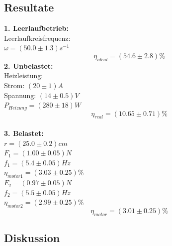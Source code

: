 \documentclass[12pt,a4paper]{article}
\begin{document}
\begin{multicols}{2}

\subsection{Resultate}
\textbf{1. Leerlaufbetrieb:}\\
Leerlaufkreisfrequenz:\\
$\omega=(50.0 \pm 1.3)s^{-1}$
$$\eta_{ideal}=(54.6 \pm 2.8)\%$$
\textbf{2. Unbelastet:}\\
Heizleistung:\\
Strom: $(20 \pm 1) A$\\
Spannung: $(14 \pm 0.5) V$\\
$P_{Heizung}=(280 \pm 18)W$\\
$$\eta_{real}=(10.65 \pm 0.71)\%$$\\

%
%
%
%



\noindent \textbf{3. Belastet:}\\
$r = (25.0 \pm 0.2)cm$\\
$F_1 = (1.00 \pm 0.05)N$\\
$f_1 = (5.4 \pm 0.05)Hz$\\
$\eta_{motor1}=(3.03\pm 0.25)\%$\\
$F_2=(0.97\pm 0.05)N$\\
$f_2 = (5.5 \pm 0.05)Hz$\\
$\eta_{motor2}=(2.99\pm 0.25)\%$\\
$$\eta_{motor}=(3.01\pm 0.25)\%$$


\subsection{Diskussion}


\end{multicols}
\end{document}
